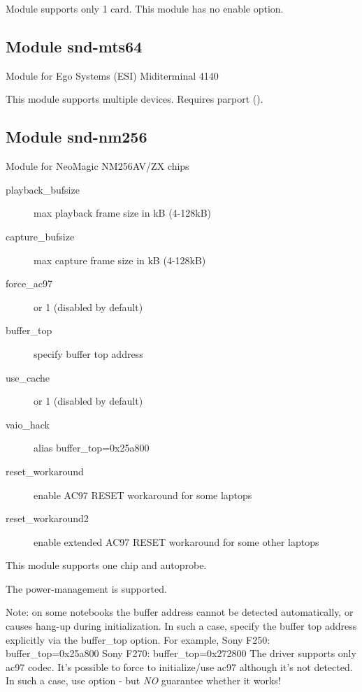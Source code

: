 \documentclass[a4paper,8pt,english]{sphinxmanual}
\begin{document}
Module supports only 1 card.  This module has no enable option.


\subsection{Module snd-mts64}
\label{sound/alsa-configuration:module-snd-mts64}
Module for Ego Systems (ESI) Miditerminal 4140

This module supports multiple devices.
Requires parport ().


\subsection{Module snd-nm256}
\label{sound/alsa-configuration:module-snd-nm256}
Module for NeoMagic NM256AV/ZX chips
\begin{description}
\item[{playback\_bufsize}] \leavevmode
max playback frame size in kB (4-128kB)

\item[{capture\_bufsize}] \leavevmode
max capture frame size in kB (4-128kB)

\item[{force\_ac97}]  or 1 (disabled by default)

\item[{buffer\_top}] \leavevmode
specify buffer top address

\item[{use\_cache}]  or 1 (disabled by default)

\item[{vaio\_hack}] \leavevmode
alias buffer\_top=0x25a800

\item[{reset\_workaround}] \leavevmode
enable AC97 RESET workaround for some laptops

\item[{reset\_workaround2}] \leavevmode
enable extended AC97 RESET workaround for some other laptops

\end{description}

This module supports one chip and autoprobe.

The power-management is supported.

Note: on some notebooks the buffer address cannot be detected
automatically, or causes hang-up during initialization.
In such a case, specify the buffer top address explicitly via
the buffer\_top option.
For example,
Sony F250: buffer\_top=0x25a800
Sony F270: buffer\_top=0x272800
The driver supports only ac97 codec.  It's possible to force
to initialize/use ac97 although it's not detected.  In such a
case, use  option - but \emph{NO} guarantee whether it
works!
\end{document}
